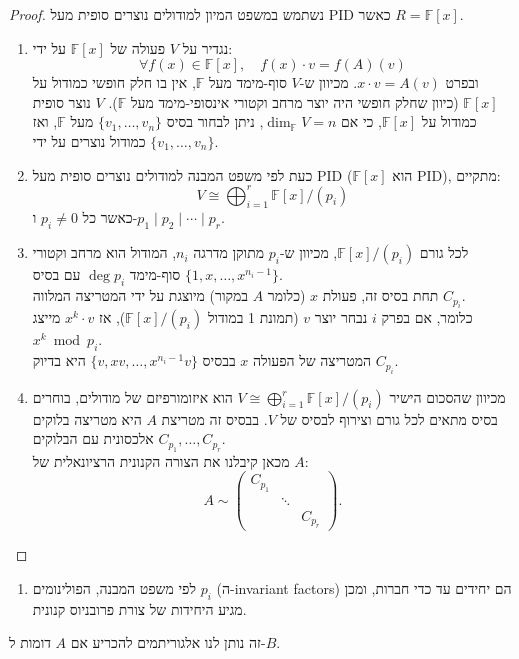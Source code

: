 \documentclass{tstextbook}
\begin{document}
\begin{proof}
נשתמש במשפט המיון למודולים נוצרים סופית מעל PID כאשר \(R = \mathbb{F}[x]\).

  \begin{enumerate}
    \item נגדיר על \(V\) פעולה של \(\mathbb{F}[x]\) על ידי: \\
$$   \forall f(x)\in \mathbb{F}[x],\quad f(x)\cdot v = f(A)(v)  $$
ובפרט \(x \cdot v = A(v)\).  מכיוון ש-\(V\) סוף-מימד מעל \(\mathbb{F}\), אין בו חלק חופשי כמודול על \(\mathbb{F}[x]\) (כיוון שחלק חופשי היה יוצר מרחב וקטורי אינסופי-מימד מעל \(\mathbb{F}\)).  \(V\) נוצר סופית כמודול על \(\mathbb{F}[x]\), כי אם \(\dim_{\mathbb{F}}V = n\), ניתן לבחור בסיס \(\{v_1,\dots,v_n\}\) מעל \(\mathbb{F}\), ואז כמודול נוצרים על ידי \(\{v_1,\dots,v_n\}\).


    \item כעת לפי משפט המבנה למודולים נוצרים סופית מעל PID (\(\mathbb{F}[x]\) הוא PID), מתקיים: 
$$V \cong \bigoplus_{i=1}^r \mathbb{F}[x] / (p_i)$$
   כאשר כל \(p_i \neq 0\) ו-\(p_1 \mid p_2 \mid \cdots \mid p_r\).  


    \item לכל גורם \(\mathbb{F}[x]/(p_i)\), מכיוון ש-\(p_i\) מתוקן מדרגה \(n_i\), המודול הוא מרחב וקטורי סוף-מימד \(\deg p_i\) עם בסיס \(\{1, x, \dots, x^{n_i-1}\}\). \\

   תחת בסיס זה, פעולת \(x\) (כלומר \(A\) במקור) מיוצגת על ידי המטריצה המלווה \(C_{p_i}\).\\

   כלומר, אם בפרק \(i\) נבחר יוצר \(v\) (תמונת 1 במודול \(\mathbb{F}[x]/(p_i)\)), אז \(x^k \cdot v\) מייצג \(x^k \bmod p_i\).\\

   המטריצה של הפעולה \(x\) בבסיס \(\{v, x v, \dots, x^{n_i-1} v\}\) היא בדיוק \(C_{p_i}\).


    \item מכיוון שהסכום הישיר \(V \cong \bigoplus_{i=1}^r \mathbb{F}[x]/(p_i)\) הוא איזומורפיזם של מודולים, בוחרים בסיס מתאים לכל גורם וצירוף לבסיס של \(V\). בבסיס זה מטריצת \(A\) היא מטריצה בלוקים אלכסונית עם הבלוקים \(C_{p_1}, \dots, C_{p_r}\). \\

   מכאן קיבלנו את הצורה הקנונית הרציונאלית של \(A\):\\
$$   A \sim    \begin{pmatrix}   C_{p_1} & & \\   & \ddots & \\   & & C_{p_r}   \end{pmatrix}.
   $$


  \end{enumerate}
\end{proof}
\begin{enumerate}
  \item לפי משפט המבנה, הפולינומים \(p_i\) (ה-invariant factors) הם יחידים עד כדי חברות, ומכן מגיע היחידות של צורת פרובניוס קנונית. 
\end{enumerate}
זה נותן לנו אלגוריתמים להכריע אם \(A\) דומות ל-\(B\).
\end{document}
